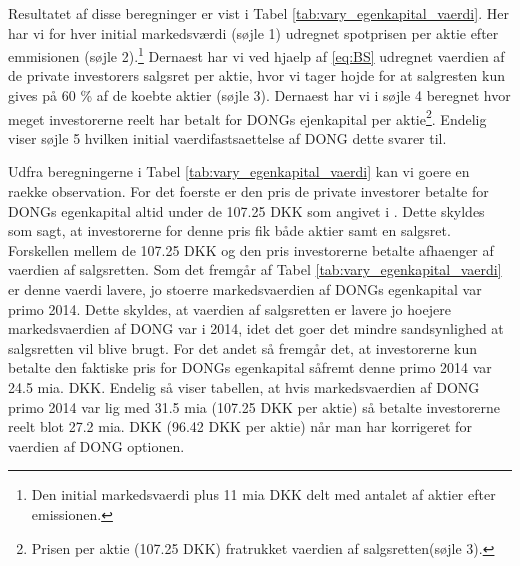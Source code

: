 \documentclass{article}
\begin{document}
Resultatet af disse beregninger er vist i Tabel \ref{tab:vary_egenkapital_vaerdi}. Her har vi for hver initial markedsværdi (søjle 1) udregnet spotprisen per aktie efter emmisionen (søjle 2).\footnote{Den initial markedsvaerdi plus 11 mia DKK delt med antalet af aktier efter emissionen.} Dernaest har vi ved hjaelp af \ref{eq:BS} udregnet vaerdien af de private investorers salgsret per aktie, hvor vi tager hojde for at salgresten kun gives på 60 \% af de koebte aktier (søjle 3). Dernaest har vi i søjle 4 beregnet hvor meget investorerne reelt har betalt for DONGs ejenkapital per aktie\footnote{Prisen per aktie (107.25 DKK) fratrukket vaerdien af salgsretten(søjle 3).}. Endelig viser søjle 5 hvilken initial vaerdifastsaettelse af DONG dette svarer til. 
 
Udfra beregningerne i Tabel \ref{tab:vary_egenkapital_vaerdi} kan vi goere en raekke observation. For det foerste er den pris de private investorer betalte for DONGs egenkapital altid under de 107.25 DKK som angivet i \citep{FM2013a}. Dette skyldes som sagt, at investorerne for denne pris fik både aktier samt en salgsret. Forskellen mellem de 107.25 DKK og den pris investorerne betalte afhaenger af vaerdien af salgsretten. Som det fremgår af Tabel \ref{tab:vary_egenkapital_vaerdi} er denne vaerdi lavere, jo stoerre markedsvaerdien af DONGs egenkapital var primo 2014. Dette skyldes, at vaerdien af salgsretten er lavere jo hoejere markedsvaerdien af DONG var i 2014, idet det goer det mindre sandsynlighed at salgsretten vil blive brugt. For det andet så fremgår det, at investorerne kun betalte den faktiske pris for DONGs egenkapital såfremt denne primo 2014 var 24.5 mia. DKK. Endelig så viser tabellen, at hvis markedsvaerdien af DONG primo 2014 var lig med 31.5 mia (107.25 DKK per aktie) så betalte investorerne reelt blot 27.2 mia. DKK (96.42 DKK per aktie) når man har korrigeret for vaerdien af DONG optionen.
\end{document}
